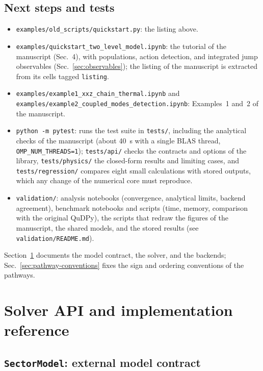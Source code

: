 \documentclass[11pt]{article}
\newcommand{\ArtSecUsage}{4}           %
\begin{document}
\subsection{Next steps and tests}
\begin{itemize}
\item \texttt{examples/old\_scripts/quickstart.py}: the listing above.
\item \texttt{examples/quickstart\_two\_level\_model.ipynb}: the tutorial of the manuscript (Sec.~\ArtSecUsage), with populations, action detection, and integrated jump observables (Sec.~\ref{sec:observables}); the listing of the manuscript is extracted from its cells tagged \texttt{listing}.
\item \texttt{examples/example1\_xxz\_chain\_thermal.ipynb} and \texttt{examples/example2\_coupled\_modes\_detection.ipynb}: Examples~1 and~2 of the manuscript.
\item \texttt{python -m pytest}: runs the test suite in \texttt{tests/}, including the analytical checks of the manuscript (about 40~s with a single BLAS thread, \texttt{OMP\_NUM\_THREADS=1}); \texttt{tests/api/} checks the contracts and options of the library, \texttt{tests/physics/} the closed-form results and limiting cases, and \texttt{tests/regression/} compares eight small calculations with stored outputs, which any change of the numerical core must reproduce.
\item \texttt{validation/}: analysis notebooks (convergence, analytical limits, backend agreement), benchmark notebooks and scripts (time, memory, comparison with the original QuDPy), the scripts that redraw the figures of the manuscript, the shared models, and the stored results (see \texttt{validation/README.md}).
\end{itemize}
Section~\ref{app1} documents the model contract, the solver, and the backends; Sec.~\ref{sec:pathway-conventions} fixes the sign and ordering conventions of the pathways.


\section{Solver API and implementation reference}
\label{app1}
\subsection{\texttt{SectorModel}: external model contract}
\end{document}

